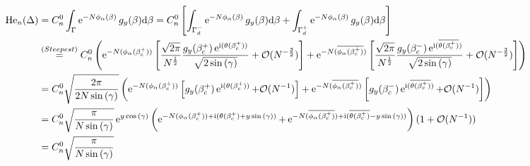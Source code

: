 \begin{equation}
	\begin{split}
		\He_n(\Delta) &= C_n^0 \int_{\Gamma}  \ee^{-N \phi_\alpha(\beta)} g_y(\beta) \dd \beta  = C_n^0  \left[ \int_{\Gamma_d^-}  \ee^{-N \phi_\alpha(\beta)} g_y(\beta) \dd \beta + \int_{\Gamma_d^+}  \ee^{-N \phi_\alpha(\beta)} g_y(\beta) \dd \beta  \right]\\
		& \stackrel{(Steepest)}{=}  
		C_n^0 \left(
		\ee^{-N(\phi_\alpha(\beta_c^+))} 
		\left[
		\frac{\sqrt{2\pi}}{N^{\frac{1}{2}}}
		\frac{g_y(\beta^+_c) \ee^{\ii (\theta(\beta_c^+))}}{\sqrt{2\sin{(\gamma)}}} 
		+ \Boh(N^{-\frac{3}{2}})
		\right]
		+
		\ee^{-N(\overline{\phi_\alpha(\beta_c^+)})} 
		\left[
		\frac{\sqrt{2\pi}}{N^{\frac{1}{2}}}
		\frac{g_y(\beta^-_c) \ee^{\ii (\overline{\theta(\beta_c^+)})}}{\sqrt{2\sin{(\gamma)}}}
		+ \Boh(N^{-\frac{3}{2}})
		\right]   
		\right)
		\\
		& = C_n^0 \sqrt{\frac{2\pi}{2N\sin{(\gamma)}}} \left(
		\ee^{-N(\phi_\alpha(\beta_c^+))} 
		\left[
		g_y(\beta^+_c)
		\ee^{\ii(\theta(\beta_c^+))} 
		+ \Boh(N^{-1})
		\right]
		+
		\ee^{-N(\overline{\phi_\alpha(\beta_c^+)})} 
		\left[
		g_y(\beta^-_c)
		\ee^{\ii(\overline{\theta(\beta_c^+)})}
		+ \Boh(N^{-1})
		\right]   
		\right)
		\\
		& = C_n^0 \sqrt{\frac{\pi}{N\sin{(\gamma)}}} \ee^{y \cos{(\gamma)}}
		\left(
		\ee^{-N(\phi_\alpha(\beta_c^+)) + \ii(\theta(\beta_c^+) + y \sin{(\gamma)})} +
		\ee^{-N(\overline{\phi_\alpha(\beta_c^+)})+\ii(\overline{\theta(\beta_c^+)} - y \sin{(\gamma)})} 
		\right)
		(1 + \Boh(N^{-1}))   
		\\
		& =  C_n^0 \sqrt{\frac{\pi}{N\sin{(\gamma)}}}

\end{split}
\end{equation}
